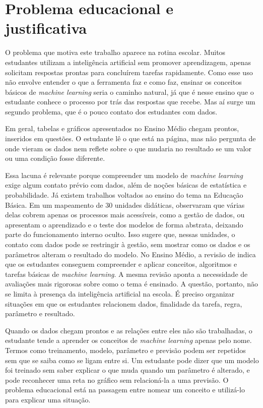 \section{Problema educacional e justificativa}

O problema que motiva este trabalho aparece na rotina escolar. Muitos estudantes utilizam a inteligência artificial sem promover aprendizagem, apenas solicitam respostas prontas para concluírem tarefas rapidamente. Como esse uso não envolve entender o que a ferramenta faz e como faz, ensinar os conceitos básicos de \textit{machine learning} seria o caminho natural, já que é nesse ensino que o estudante conhece o processo por trás das respostas que recebe. Mas aí surge um segundo problema, que é o pouco contato dos estudantes com dados.

Em geral, tabelas e gráficos apresentados no Ensino Médio chegam prontos, inseridos em questões. O estudante lê o que está na página, mas não pergunta de onde vieram os dados nem reflete sobre o que mudaria no resultado se um valor ou uma condição fosse diferente.

Essa lacuna é relevante porque compreender um modelo de \textit{machine learning} exige algum contato prévio com dados, além de noções básicas de estatística e probabilidade. Já existem trabalhos voltados ao ensino do tema na Educação Básica. Em um mapeamento de 30 unidades didáticas,  observaram que várias delas cobrem apenas os processos mais acessíveis, como a gestão de dados, ou apresentam o aprendizado e o teste dos modelos de forma abstrata, deixando parte do funcionamento interno oculto. Isso sugere que, nessas unidades, o contato com dados pode se restringir à gestão, sem mostrar como os dados e os parâmetros alteram o resultado do modelo. No Ensino Médio, a revisão de  indica que os estudantes conseguem compreender e aplicar conceitos, algoritmos e tarefas básicas de \textit{machine learning}. A mesma revisão aponta a necessidade de avaliações mais rigorosas sobre como o tema é ensinado. A questão, portanto, não se limita à presença da inteligência artificial na escola. É preciso organizar situações em que os estudantes relacionem dados, finalidade da tarefa, regra, parâmetro e resultado.

Quando os dados chegam prontos e as relações entre eles não são trabalhadas, o estudante tende a aprender os conceitos de \textit{machine learning} apenas pelo nome. Termos como treinamento, modelo, parâmetro e previsão podem ser repetidos sem que se saiba como se ligam entre si. Um estudante pode dizer que um modelo foi treinado sem saber explicar o que muda quando um parâmetro é alterado, e pode reconhecer uma reta no gráfico sem relacioná-la a uma previsão. O problema educacional está na passagem entre nomear um conceito e utilizá-lo para explicar uma situação.

